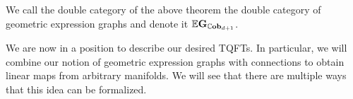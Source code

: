 \documentclass[./Thick_TQFTs_and_Quantum_Information.tex]{subfiles}
\begin{document}
\begin{defn}
We call the double category of the above theorem the double category of
geometric expression graphs and denote it $\mathbb{E}\textbf{G}_{\mathbb{C}\textbf{ob}_{d + 1}}$.
\end{defn}

We are now in a position to describe our desired TQFTs. In particular, we will
combine our notion of geometric expression graphs with connections to obtain
linear maps from arbitrary manifolds. We will see that there are multiple ways
that this idea can be formalized.
\end{document}
